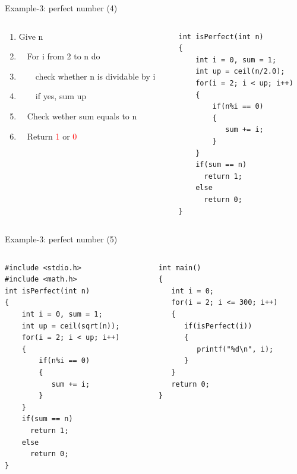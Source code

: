 \begin{frame}[fragile]{Example-3: perfect number (4)}
\vspace{-0.15in}
\begin{columns}
\begin{column}{0.55\linewidth}
\begin{enumerate}
	\item {Give n}
	\item {~~For i from 2 to n do}
	\item {~~~~check whether n is dividable by i}
	\item {~~~~if yes, sum up}
	\item {~~Check wether sum equals to n}
	\item {~~Return \textcolor{red}{1} or \textcolor{red}{0}}
\end{enumerate}
\end{column}
\begin{column}{0.45\linewidth}
\begin{lstlisting}
int isPerfect(int n)
{
    int i = 0, sum = 1;
    int up = ceil(n/2.0);
    for(i = 2; i < up; i++)
    {
        if(n%i == 0)
        {
           sum += i;
        }
    }
    if(sum == n)
      return 1;
    else 
      return 0;
}
\end{lstlisting}
\end{column}
\end{columns}
\end{frame}

\begin{frame}[fragile]{Example-3: perfect number (5)}
\vspace{-0.16in}
\begin{columns}
\begin{column}{0.48\linewidth}
\begin{lstlisting}[linewidth=0.95\linewidth]
#include <stdio.h>
#include <math.h>
int isPerfect(int n)
{
    int i = 0, sum = 1;
    int up = ceil(sqrt(n));
    for(i = 2; i < up; i++)
    {
        if(n%i == 0)
        {
           sum += i;
        }
    }
    if(sum == n)
      return 1;
    else 
      return 0;
}
\end{lstlisting}
\end{column}
\begin{column}{0.48\linewidth}
\begin{lstlisting}[firstnumber=19, linewidth=0.95\linewidth]
int main()
{
   int i = 0;
   for(i = 2; i <= 300; i++)
   {
      if(isPerfect(i))
      {
         printf("%d\n", i);
      }
   }
   return 0;
}
\end{lstlisting}
\end{column}
\end{columns}
\end{frame}



